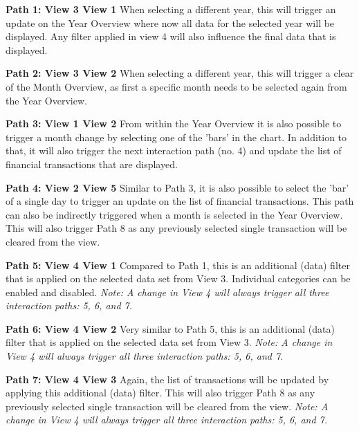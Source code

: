 \textbf{Path 1: View 3 \textrightarrow View 1} \newline
When selecting a different year, this will trigger an update on the Year Overview where now all data for the selected year will be displayed. Any filter applied in view 4 will also influence the final data that is displayed.

\textbf{Path 2: View 3 \textrightarrow View 2} \newline
When selecting a different year, this will trigger a clear of the Month Overview, as first a specific month needs to be selected again from the Year Overview.

\textbf{Path 3: View 1 \textrightarrow View 2} \newline
From within the Year Overview it is also possible to trigger a month change by selecting one of the 'bars' in the chart. In addition to that, it will also trigger the next interaction path (no. 4) and update the list of financial transactions that are displayed.

\textbf{Path 4: View 2 \textrightarrow View 5} \newline
Similar to Path 3, it is also possible to select the 'bar' of a single day to trigger an update on the list of financial transactions. This path can also be indirectly triggered when a month is selected in the Year Overview. This will also trigger Path 8 as any previously selected single transaction will be cleared from the view.

\textbf{Path 5: View 4 \textrightarrow View 1} \newline
Compared to Path 1, this is an additional (data) filter that is applied on the selected data set from View 3. Individual categories can be enabled and disabled. \textit{Note: A change in View 4 will always trigger all three interaction paths: 5, 6, and 7.}

\textbf{Path 6: View 4 \textrightarrow View 2} \newline
Very similar to Path 5, this is an additional (data) filter that is applied on the selected data set from View 3. \textit{Note: A change in View 4 will always trigger all three interaction paths: 5, 6, and 7.}

\textbf{Path 7: View 4 \textrightarrow View 3} \newline
Again, the list of transactions will be updated by applying this additional (data) filter. This will also trigger Path 8 as any previously selected single transaction will be cleared from the view. \textit{Note: A change in View 4 will always trigger all three interaction paths: 5, 6, and 7.}

